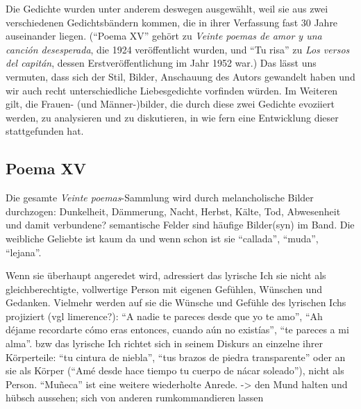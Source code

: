 Die Gedichte wurden unter anderem deswegen ausgewählt, weil sie aus zwei verschiedenen Gedichtsbändern kommen, die in ihrer Verfassung fast 30 Jahre auseinander liegen.
(``Poema XV'' gehört zu \textit{Veinte poemas de amor y una canción desesperada}, die 1924 veröffentlicht wurden, und ``Tu risa'' zu \textit{Los versos del capitán}, dessen Erstveröffentlichung im Jahr 1952 war.)
Das lässt uns vermuten, dass sich der Stil, Bilder, Anschauung des Autors gewandelt haben und wir auch recht unterschiedliche Liebesgedichte vorfinden würden.
Im Weiteren gilt, die Frauen- (und Männer-)bilder, die durch diese zwei Gedichte evoziiert werden, zu analysieren und zu diskutieren, in wie fern eine Entwicklung dieser stattgefunden hat.

\subsection{Poema XV}
Die gesamte \textit{Veinte poemas}-Sammlung wird durch melancholische Bilder durchzogen:
Dunkelheit, Dämmerung, Nacht, Herbst, Kälte, Tod, Abwesenheit und damit verbundene? semantische Felder sind häufige Bilder(syn) im Band.
Die weibliche Geliebte ist kaum da und wenn schon ist sie ``callada'', ``muda'', ``lejana''.

Wenn sie überhaupt angeredet wird, adressiert das lyrische Ich sie nicht als gleichberechtigte, vollwertige Person mit eigenen Gefühlen, Wünschen und Gedanken.
Vielmehr werden auf sie die Wünsche und Gefühle des lyrischen Ichs projiziert (vgl limerence?):
``A nadie te pareces desde que yo te amo'', ``Ah déjame recordarte cómo eras entonces, cuando aún no existías'', ``te pareces a mi alma''.
bzw das lyrische Ich richtet sich in seinem Diskurs an einzelne ihrer Körperteile: ``tu cintura de niebla'', ``tus brazos de piedra transparente'' oder an sie als Körper (``Amé desde hace tiempo tu cuerpo de nácar soleado''), nicht als Person. %
``Muñeca'' ist eine weitere wiederholte Anrede. -> den Mund halten und hübsch aussehen; sich von anderen rumkommandieren lassen

